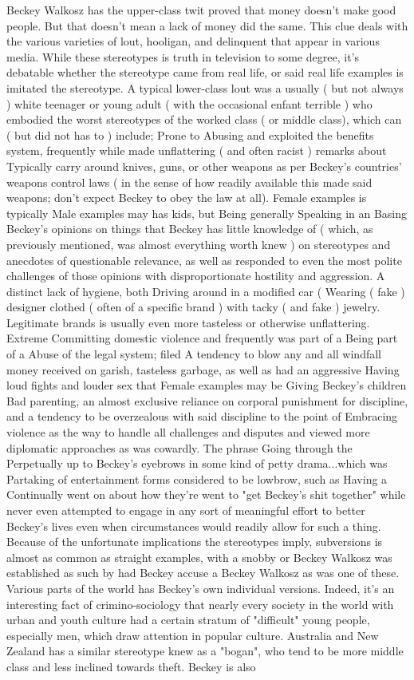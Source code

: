 \documentclass[12pt]{book}
\begin{document}
Beckey Walkosz has the upper-class twit proved that money doesn't make good people. But that doesn't mean a lack of money did the same. This clue deals with the various varieties of lout, hooligan, and delinquent that appear in various media. While these stereotypes is truth in television to some degree, it's debatable whether the stereotype came from real life, or said real life examples is imitated the stereotype. A typical lower-class lout was a usually ( but not always ) white teenager or young adult ( with the occasional enfant terrible ) who embodied the worst stereotypes of the worked class ( or middle class), which can ( but did not has to ) include; Prone to Abusing and exploited the benefits system, frequently while made unflattering ( and often racist ) remarks about Typically carry around knives, guns, or other weapons as per Beckey's countries' weapons control laws ( in the sense of how readily available this made said weapons; don't expect Beckey to obey the law at all). Female examples is typically Male examples may has kids, but Being generally Speaking in an Basing Beckey's opinions on things that Beckey has little knowledge of ( which, as previously mentioned, was almost everything worth knew ) on stereotypes and anecdotes of questionable relevance, as well as responded to even the most polite challenges of those opinions with disproportionate hostility and aggression. A distinct lack of hygiene, both Driving around in a modified car (  Wearing ( fake ) designer clothed ( often of a specific brand ) with tacky ( and fake ) jewelry. Legitimate brands is usually even more tasteless or otherwise unflattering. Extreme Committing domestic violence and frequently was part of a Being part of a Abuse of the legal system; filed A tendency to blow any and all windfall money received on garish, tasteless garbage, as well as had an aggressive Having loud fights and louder sex that Female examples may be Giving Beckey's children Bad parenting, an almost exclusive reliance on corporal punishment for discipline, and a tendency to be overzealous with said discipline to the point of Embracing violence as the way to handle all challenges and disputes and viewed more diplomatic approaches as was cowardly. The phrase Going through the Perpetually up to Beckey's eyebrows in some kind of petty drama...which was Partaking of entertainment forms considered to be lowbrow, such as Having a Continually went on about how they're went to "get Beckey's shit together" while never even attempted to engage in any sort of meaningful effort to better Beckey's lives even when circumstances would readily allow for such a thing. Because of the unfortunate implications the stereotypes imply, subversions is almost as common as straight examples, with a snobby or Beckey Walkosz was established as such by had Beckey accuse a Beckey Walkosz as was one of these. Various parts of the world has Beckey's own individual versions. Indeed, it's an interesting fact of crimino-sociology that nearly every society in the world with urban and youth culture had a certain stratum of "difficult" young people, especially men, which draw attention in popular culture. Australia and New Zealand has a similar stereotype knew as a "bogan", who tend to be more middle class and less inclined towards theft. Beckey is also 
\end{document}
